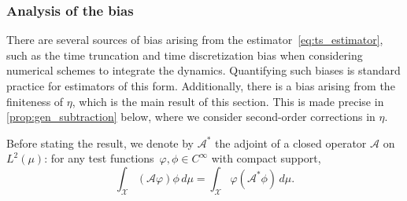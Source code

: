 \subsubsection{Analysis of the bias}
\label{subsubsec:bias_analysis}
%
There are several sources of bias arising from the estimator~\eqref{eq:ts_estimator}, such as the time truncation and time discretization bias when considering numerical schemes to integrate the dynamics. Quantifying such biases is standard practice for estimators of this form. Additionally, there is a bias arising from the finiteness of $\eta$, which is the main result of this section. This is made precise in \cref{prop:gen_subtraction} below, where we consider second-order corrections in $\eta$. 

Before stating the result, we denote by $\mathcal{A}^*$ the adjoint of a closed operator $\mathcal{A}$ on $L^2(\mu)$: for any test functions~$\varphi, \phi \in C^\infty$ with compact support,
%
\begin{equation}
    \int_\mathcal{X} (\mathcal{A}\varphi)\phi \, d\mu = \int_\mathcal{X} \varphi(\mathcal{A}^*\phi) \, d\mu.
    \label{eq:Astar_adjoint}
\end{equation}
%
%


